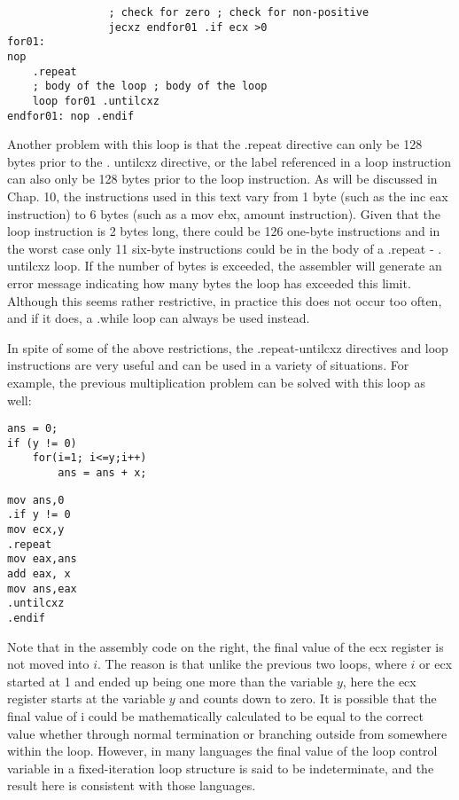 \documentclass[10pt]{article}
\begin{document}
\begin{verbatim}
                ; check for zero ; check for non-positive
                jecxz endfor01 .if ecx >0
for01:
nop
    .repeat
    ; body of the loop ; body of the loop
    loop for01 .untilcxz
endfor01: nop .endif
\end{verbatim}

Another problem with this loop is that the .repeat directive can only be 128 bytes prior to the . untilcxz directive, or the label referenced in a loop instruction can also only be 128 bytes prior to the loop instruction. As will be discussed in Chap. 10, the instructions used in this text vary from 1 byte (such as the inc eax instruction) to 6 bytes (such as a mov ebx, amount instruction). Given that the loop instruction is 2 bytes long, there could be 126 one-byte instructions and in the worst case only 11 six-byte instructions could be in the body of a .repeat - . untilcxz loop. If the number of bytes is exceeded, the assembler will generate an error message indicating how many bytes the loop has exceeded this limit. Although this seems rather restrictive, in practice this does not occur too often, and if it does, a .while loop can always be used instead.

In spite of some of the above restrictions, the .repeat-untilcxz directives and loop instructions are very useful and can be used in a variety of situations. For example, the previous multiplication problem can be solved with this loop as well:

\begin{verbatim}
ans = 0;
if (y != 0)
    for(i=1; i<=y;i++)
        ans = ans + x;
\end{verbatim}

\begin{verbatim}
mov ans,0
.if y != 0
mov ecx,y
.repeat
mov eax,ans
add eax, x
mov ans,eax
.untilcxz
.endif
\end{verbatim}

Note that in the assembly code on the right, the final value of the ecx register is not moved into $i$. The reason is that unlike the previous two loops, where $i$ or ecx started at 1 and ended up being one more than the variable $y$, here the ecx register starts at the variable $y$ and counts down to zero. It is possible that the final value of i could be mathematically calculated to be equal to the correct value whether through normal termination or branching outside from somewhere within the loop. However, in many languages the final value of the loop control variable in a fixed-iteration loop structure is said to be indeterminate, and the result here is consistent with those languages.
\end{document}
